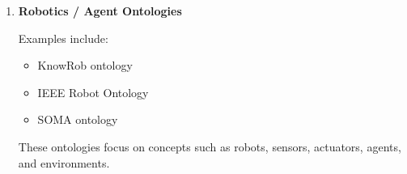 \documentclass[a4paper]{article}
\begin{document}
\begin{enumerate}
        This is very similar to the \emph{Mind $\rightarrow$ Cognition} part of the proposed hierarchy.
        
        Relevance to this work: high.
        
        Estimated confidence: about 90\%.
        
        \item \textbf{Robotics / Agent Ontologies}
        
        Examples include:
        
        \begin{itemize}
            \item KnowRob ontology
            \item IEEE Robot Ontology
            \item SOMA ontology
        \end{itemize}
        
        These ontologies focus on concepts such as robots, sensors, actuators, agents, and environments.
        
    \end{enumerate}
\end{document}
